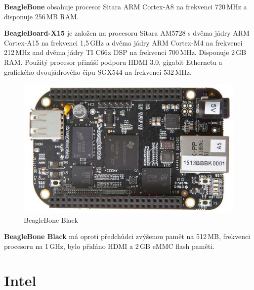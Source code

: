 \textbf{BeagleBone} obsahuje procesor Sitara ARM Cortex-A8 na frekvenci 720\,MHz a disponuje 256\,MB RAM.

\textbf{BeagleBoard-X15} je založen na procesoru Sitara AM5728 s dvěma jádry ARM Cortex-A15 na frekvenci 1,5\,GHz a dvěma jádry ARM Cortex-M4 na frekvenci 212\,MHz and dvěma jádry TI C66x DSP na frekvenci 700\,MHz. Disponuje 2\,GB RAM. Použitý procesor přináší podporu HDMI 3.0, gigabit Ethernetu a grafického dvoujádrového čipu SGX544 na frekvenci 532\,MHz. 

	\begin{figure}[!ht]
  \begin{center}
    \includegraphics[scale=0.7]{obrazky/embed_beaglebone_black}
  \end{center}
  \caption{BeagleBone Black~\cite{BeagleBone}}
\end{figure}

\textbf{BeagleBone Black} má oproti předchůdci zvýšenou pamět na 512\,MB, frekvenci procesoru na 1\,GHz, bylo přidáno HDMI a 2\,GB eMMC flash paměti.


\section{Intel}
\label{KapIntel}

